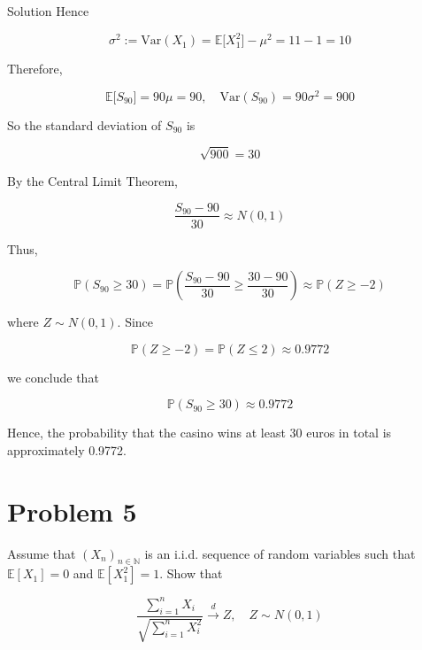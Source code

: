 \begin{qlsolution}{Solution}
Hence

\[\mathit{\sigma}^{2} := \text{Var}(\mathit{X}_{1}) = \mathbb{E}\lbrack\mathit{X}_{1}^{2}\rbrack - \mathit{\mu}^{2} = 11 - 1 = 10\]

Therefore,

\[\mathbb{E}\lbrack\mathit{S}_{90}\rbrack = 90\mathit{\mu} = 90,\quad\text{Var}(\mathit{S}_{90}) = 90\mathit{\sigma}^{2} = 900\]

So the standard deviation of \(\mathit{S}_{90}\) is

\[\sqrt{900} = 30\]

By the Central Limit Theorem,

\[\frac{\mathit{S}_{90} - 90}{30} \approx \mathit{N}(0,1)\]

Thus,

\[\mathbb{P}(\mathit{S}_{90} \geq 30) = \mathbb{P}\left( {\frac{\mathit{S}_{90} - 90}{30} \geq \frac{30 - 90}{30}} \right) \approx \mathbb{P}(\mathit{Z} \geq - 2)\]

where \(\mathit{Z} \sim \mathit{N}(0,1)\). Since

\[\mathbb{P}(\mathit{Z} \geq - 2) = \mathbb{P}(\mathit{Z} \leq 2) \approx 0.9772\]

we conclude that

\[\mathbb{P}(\mathit{S}_{90} \geq 30) \approx 0.9772\]

Hence, the probability that the casino wins at least 30 euros in total is approximately 0.9772.

\end{qlsolution}

\section{Problem 5}\label{hw06-problem-5}

Assume that \(\left( \mathit{X}_{\mathit{n}} \right)_{\mathit{n} \in \mathbb{N}}\) is an i.i.d. sequence of random variables such that \(\mathbb{E}\left\lbrack \mathit{X}_{1} \right\rbrack = 0\) and \(\mathbb{E}\left\lbrack \mathit{X}_{1}^{2} \right\rbrack = 1\). Show that

\[\frac{\sum_{\mathit{i} = 1}^{\mathit{n}}\mathit{X}_{\mathit{i}}}{\sqrt{\sum_{\mathit{i} = 1}^{\mathit{n}}\mathit{X}_{\mathit{i}}^{2}}}\overset{\mathit{d}}{\rightarrow}\mathit{Z},\quad\mathit{Z} \sim \mathit{N}(0,1)\]

